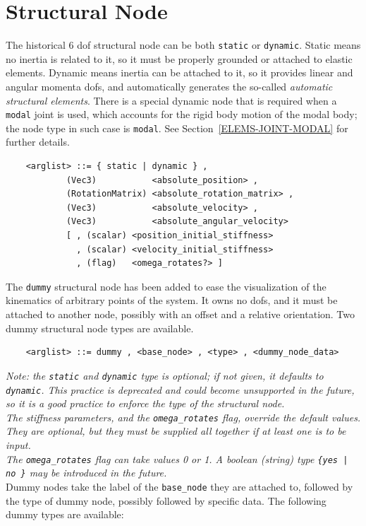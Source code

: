 \documentclass[10pt,dvips]{report}
\begin{document}
\section{Structural Node}\label{sec:NODE-STRUCT}
The historical 6 dof structural node can be both {\tt static}
or {\tt dynamic}.
Static means no inertia is related to it, so it must be properly grounded 
or attached to elastic elements.
Dynamic means inertia can be attached to it, so it provides linear and
angular momenta dofs, and automatically generates the so-called 
{\em automatic structural elements}.
There is a special dynamic node that is required when a {\tt modal} joint is
used, which accounts for the rigid body motion of the modal body; the node
type in such case is {\tt modal}.
See Section~\ref{ELEMS-JOINT-MODAL} for further details.
\begin{verbatim}
    <arglist> ::= { static | dynamic } ,
            (Vec3)           <absolute_position> ,
            (RotationMatrix) <absolute_rotation_matrix> ,
            (Vec3)           <absolute_velocity> ,
            (Vec3)           <absolute_angular_velocity>
            [ , (scalar) <position_initial_stiffness>
              , (scalar) <velocity_initial_stiffness>
              , (flag)   <omega_rotates?> ]
\end{verbatim}
The {\tt dummy} structural node has been added to ease the visualization of
the kinematics of arbitrary points of the system. 
It owns no dofs, and it must be attached to another node, possibly with an
offset and a relative orientation.
Two dummy structural node types are available.
\begin{verbatim}
    <arglist> ::= dummy , <base_node> , <type> , <dummy_node_data>
\end{verbatim}
{\em 
    Note: the {\tt static} and {\tt dynamic} type is optional; if not given,
    it defaults to {\tt dynamic}. 
    This practice is deprecated and could become unsupported in the future, 
    so it is a good practice to enforce the type of the structural node. \\
    The stiffness parameters, and the {\tt omega\_rotates} flag, 
    override the default values. 
    They are optional, but they must be supplied all together if at least
    one is to be input. \\
    The {\tt omega\_rotates} flag can take values 0 or 1. 
    A boolean (string) type {\tt \{yes | no \}} may be introduced in the
    future. 
} \\
Dummy nodes take the label of the {\tt base\_node} they are attached to, 
followed by the type of dummy node, possibly followed by specific data.
The following dummy types are available:
\end{document}
